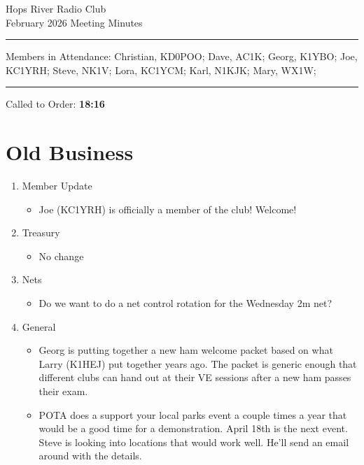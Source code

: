 \documentclass[12pt, letterpaper]{article}
\begin{document}
\begin{center}
	\huge{Hops River Radio Club}\\[10pt]
	\large{February 2026 Meeting Minutes}
\end{center}
\rule{\textwidth}{0.5pt}
	\noindent Members in Attendance: Christian, KD0POO; Dave, AC1K; Georg, K1YBO; Joe, KC1YRH; Steve, NK1V; Lora, KC1YCM; Karl, N1KJK; Mary, WX1W;

\rule{\textwidth}{0.5pt}

Called to Order: \textbf{18:16}

\section{Old Business}
    \begin{enumerate}
    \item Member Update
        \begin{itemize}
            \item  Joe (KC1YRH) is officially a member of the club! Welcome!
        \end{itemize}
    \item Treasury
        \begin{itemize}
            \item No change
        \end{itemize}
    \item Nets
        \begin{itemize}
            \item Do we want to do a net control rotation for the Wednesday 2m net?
        \end{itemize}
    \item General
        \begin{itemize}
            \item Georg is putting together a new ham welcome packet based on what Larry (K1HEJ) put together years ago. The packet is generic enough that different clubs can hand out at their VE sessions after a new ham passes their exam.
            \item POTA does a support your local parks event a couple times a year that would be a good time for a demonstration. April 18th is the next event. Steve is looking into locations that would work well. He'll send an email around with the details.
        \end{itemize}
    \end{enumerate}
\end{document}
